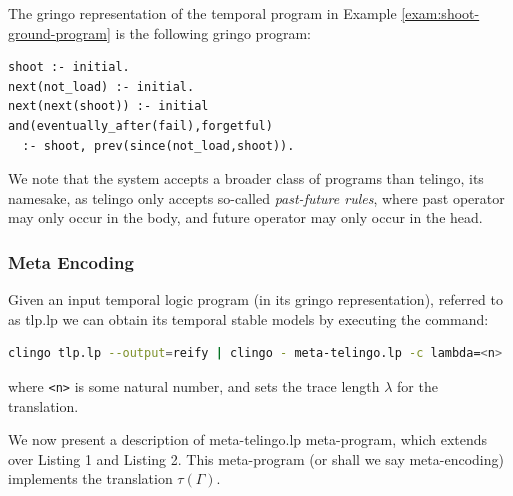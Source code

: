 \begin{example}\label{exam:shoot-ground-symbolic}
  The gringo representation of the temporal program in Example
  \ref{exam:shoot-ground-program} is the following gringo program:
\begin{center}
    \begin{lstlisting}[numbers=none]
shoot :- initial.
next(not_load) :- initial.
next(next(shoot)) :- initial
and(eventually_after(fail),forgetful) 
  :- shoot, prev(since(not_load,shoot)).
    \end{lstlisting}
\end{center}
\end{example}

We note that the system accepts a broader class of programs than
telingo, its namesake, as telingo only accepts so-called
\emph{past-future rules}, where past operator may only occur in the
body, and future operator may only occur in the head.

\subsubsection{Meta Encoding}

Given an input temporal logic program (in its gringo representation),
referred to as tlp.lp we can obtain its temporal stable models by
executing the command:

\begin{lstlisting}[language=bash,numbers=none]
clingo tlp.lp --output=reify | clingo - meta-telingo.lp -c lambda=<n>
\end{lstlisting}

where \verb|<n>| is some natural number, and sets the trace length
$\lambda$ for the translation. 

We now present a description of meta-telingo.lp meta-program, which
extends over Listing 1 and Listing 2. This meta-program (or shall we
say meta-encoding) implements the translation $\tau(\Gamma)$.

